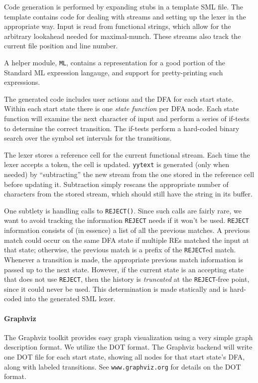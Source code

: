 \documentclass[11pt]{article}
\newcommand{\nm}[1]{\texttt{#1}}
\begin{document}
Code generation is performed by expanding stubs in a template SML file.  The
template contains code for dealing with streams and setting up the lexer in the
appropriate way.  Input is read from functional strings, which allow for
the arbitrary lookahead needed for maximal-munch.  These streams also track
the current file position and line number.

A helper module, \nm{ML}, contains a representation for a good portion of the
Standard ML expression langauge, and support for pretty-printing such
expressions.

The generated code includes user actions and the DFA for each start state.
 Within each start state there is one \emph{state function} per DFA node.  Each
state function will examine the next character of input and perform a series of
if-tests to determine the correct transition.  The if-tests perform a
hard-coded binary search over the symbol set intervals for the transitions.

The lexer stores a reference cell for the current functional stream.  Each time
the lexer accepts a token, the cell is updated.  \nm{yytext} is generated (only
when needed) by ``subtracting'' the new stream from the one stored in the
reference cell before updating it.  Subtraction simply rescans the appropriate
number of characters from the stored stream, which should still have the string
in its buffer.

One subtlety is handling calls to \nm{REJECT()}.  Since such calls are fairly
rare, we want to avoid tracking the information \nm{REJECT} needs if it won't
be used.  \nm{REJECT} information consists of (in essence) a list of all the
previous matches.  A previous match could occur on the same DFA state if
multiple REs matched the input at that state; otherwise, the previous match is
a prefix of the \nm{REJECT}ed match.  Whenever a transition is made, the
appropriate previous match information is passed up to the next state. 
However, if the current state is an accepting state that does not use
\nm{REJECT}, then the history is \emph{truncated} at the \nm{REJECT}-free
point, since it could never be used.  This determination is made statically and
is hard-coded into the generated SML lexer.

\paragraph{Graphviz}

The Graphviz toolkit provides easy graph visualization using a very simple
graph description format.  We utilize the DOT format.  The Graphviz backend
will write one DOT file for each start state, showing all nodes for that start
state's DFA, along with labeled transitions.  See \texttt{www.graphviz.org} for
details on the DOT format.
\end{document}

